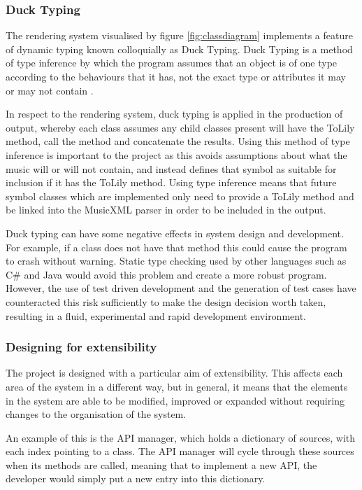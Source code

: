 \subsubsection{Duck Typing}
The rendering system visualised by figure \ref{fig:classdiagram} implements a feature of dynamic typing known colloquially as Duck Typing. Duck Typing is a method of type inference by which the program assumes that an object is of one type according to the behaviours that it has, not the exact type or attributes it may or may not contain \parencite{eric}.

In respect to the rendering system, duck typing is applied in the production of output, whereby each class assumes any child classes present will have the ToLily method, call the method and concatenate the results. Using this method of type inference is important to the project as this avoids assumptions about what the music will or will not contain, and instead defines that symbol as suitable for inclusion if it has the ToLily method. Using type inference means that future symbol classes which are implemented only need to provide a ToLily method and be linked into the MusicXML parser in order to be included in the output.

Duck typing can have some negative effects in system design and development. For example, if a class does not have that method this could cause the program to crash without warning. Static type checking used by other languages such as C\# and Java would avoid this problem and create a more robust program. However, the use of test driven development and the generation of test cases have counteracted this risk sufficiently to make the design decision worth taken, resulting in a fluid, experimental and rapid development environment.

\subsubsection{Designing for extensibility}
The project is designed with a particular aim of extensibility. This affects each area of the system in a different way, but in general, it means that the elements in the system are able to be modified, improved or expanded without requiring changes to the organisation of the system. 

An example of this is the API manager, which holds a dictionary of sources, with each index pointing to a class. The API manager will cycle through these sources when its methods are called, meaning that to implement a new API, the developer would simply put a new entry into this dictionary.

